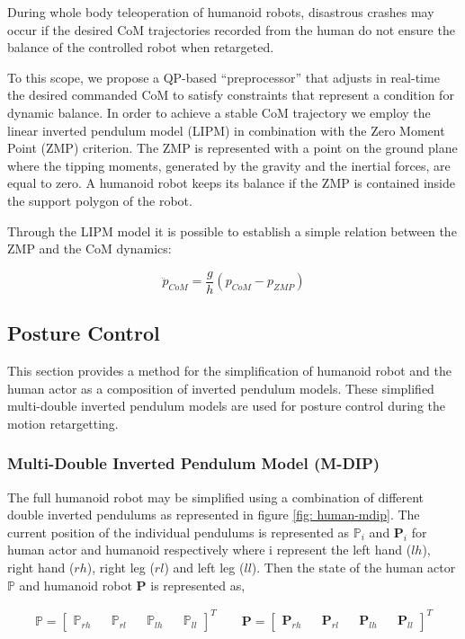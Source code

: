 During whole body teleoperation of humanoid robots, disastrous crashes may occur if the desired CoM trajectories recorded from the human do not ensure the balance of the controlled robot when retargeted.

To this scope, we propose a QP-based “preprocessor” that adjusts in real-time the desired commanded CoM to satisfy constraints that represent a condition for dynamic balance. In order to achieve a stable CoM trajectory we employ the linear inverted pendulum model (LIPM) in combination with the Zero Moment Point (ZMP) criterion.
The ZMP is represented with a point on the ground plane where the tipping moments, generated by the gravity and the inertial forces, are equal to zero. A humanoid robot keeps its balance if the ZMP is contained inside the support polygon of the robot.

Through the LIPM model it is possible to establish a simple relation between the ZMP and the CoM dynamics:

\begin{equation}
    \ddot{p}_{CoM} = \frac{g}{h}(p_{CoM} - p_{ZMP})
    \label{eq: zmp-control}
\end{equation}

\subsection{Posture Control}
\label{sec: posture-control}

This section provides a method for the simplification of humanoid robot and the human actor as a composition of inverted pendulum models. These simplified multi-double inverted pendulum models are used for posture control
during the motion retargetting.

\subsubsection{Multi-Double Inverted Pendulum Model (M-DIP)}
The full humanoid robot may be simplified using a combination of different double inverted pendulums as represented in figure \ref{fig: human-mdip}. The current position of the individual pendulums is represented as $\mathbb{P}_i$ and $\mathbf{P}_i$ for
human actor and humanoid respectively where i represent the left hand ($lh$), right hand ($rh$), right leg ($rl$) and left leg ($ll$). Then the state of the human actor $\mathbb{P}$ and humanoid robot $\mathbf{P}$ is represented as, 


\begin{align*}
    \label{eq: pendulum-state}
        \mathbb{P} = \begin{bmatrix} \mathbb{P}_{rh} && \mathbb{P}_{rl} && \mathbb{P}_{lh} && \mathbb{P}_{ll} \end{bmatrix}^T \qquad
        \mathbf{P} = \begin{bmatrix} \mathbf{P}_{rh} && \mathbf{P}_{rl} && \mathbf{P}_{lh} && \mathbf{P}_{ll} \end{bmatrix}^T
\end{align*}


